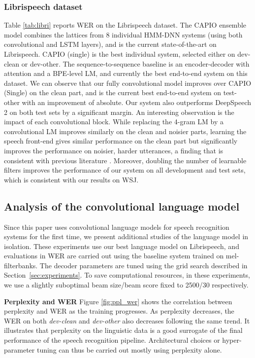 \documentclass[a4paper]{article}
\begin{document}
\subsubsection{Librispeech dataset}
Table \ref{tab:libri} reports WER on the Librispeech dataset. The CAPIO \cite{capio} ensemble model combines the lattices from 8 individual HMM-DNN systems (using both convolutional and LSTM layers), and is the current state-of-the-art on Librispeech. CAPIO (single) is the best individual system, selected either on dev-clean or dev-other. The sequence-to-sequence baseline is an encoder-decoder with attention and a BPE-level \cite{bpe} LM, and currently the best end-to-end system on this dataset. We can observe that our fully convolutional model improves over CAPIO (Single) on the clean part, and is the current best end-to-end system on test-other with an improvement of  absolute. Our system also outperforms DeepSpeech 2 on both test sets by a significant margin. An interesting observation is the impact of each convolutional block. While replacing the 4-gram LM by a convolutional LM improves similarly on the clean and noisier parts, learning the speech front-end gives similar performance on the clean part but significantly improves the performance on noisier, harder utterances, a finding that is consistent with previous literature \cite{hoshen2015speech}. Moreover, doubling the number of learnable filters improves the performance of our system on all development and test sets, which is consistent with our results on WSJ. 

\subsection{Analysis of the convolutional language model}
Since this paper uses convolutional language models for speech recognition systems for the first time, we present additional studies of the language model in isolation. These experiments use our best language model on Librispeech, and evaluations in WER are carried out using the baseline system trained on mel-filterbanks.  The decoder parameters are tuned using the grid search described in Section~\ref{sec:experiments}. To save computational resources, in these experiments, we use a slightly suboptimal beam size/beam score fixed to 2500/30 respectively. 


{\bf Perplexity and WER}
Figure \ref{fig:ppl_wer} shows the correlation between perplexity and WER as the training progresses. 
As perplexity decreases, the WER on both \emph{dev-clean} and 
\emph{dev-other} also decreases following the same trend. 
It illustrates that perplexity on the linguistic data is a good surrogate of the final performance of the speech recognition pipeline. Architectural choices or hyper-parameter tuning can thus be carried out mostly using perplexity alone.
\end{document}
